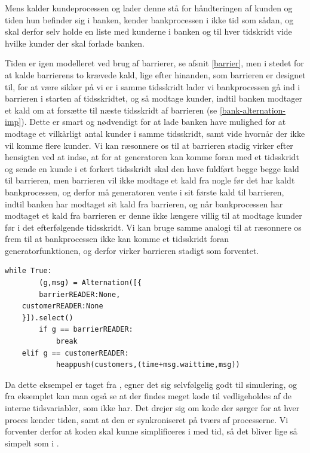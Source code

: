 Mens \simpy kalder kundeprocessen og lader denne stå for håndteringen af kunden 
og tiden hun befinder sig i banken, kender bankprocessen i \pycsp ikke tid som 
sådan, og skal derfor selv holde en liste med kunderne i banken og til hver 
tidskridt vide hvilke kunder der skal forlade banken. 

Tiden er igen modelleret ved brug af barrierer, se afsnit \cref{barrier}, men i 
stedet for at kalde barrierens to krævede kald, lige efter hinanden, som 
barrieren er designet til, for at være sikker på vi er i samme tidsskridt lader 
vi bankprocessen gå ind i barrieren i starten af tidsskridtet, og så modtage 
kunder, indtil banken modtager et kald om at forsætte til næste tidsskridt af 
barrieren (se \cref{bank-alternation-imp}). Dette er smart og nødvendigt for at lade banken have mulighed for 
at modtage et vilkårligt antal kunder i samme tidsskridt, samt vide hvornår der 
ikke vil komme flere kunder.  Vi kan ræsonnere os til at barrieren stadig 
virker efter hensigten ved at indse, at for at generatoren 
kan komme foran med et tidsskridt og sende en kunde i et forkert tidsskridt 
skal den have fuldført begge begge kald til barrieren, men barrieren vil ikke 
modtage et kald fra nogle før det har kaldt bankprocessen, og derfor må 
generatoren vente i sit første kald til barrieren, indtil banken har modtaget 
sit kald fra barrieren, og når bankprocessen har modtaget et kald fra barrieren 
er denne ikke længere villig til at modtage kunder før i det efterfølgende 
tidsskridt. Vi kan bruge samme analogi til at 
ræsonnere os frem til at bankprocessen ikke kan komme et tidsskridt foran 
generatorfunktionen, og derfor virker barrieren stadigt som forventet. 

\begin{lstlisting}[float=hbtp,label=bank-alternation-imp,caption=Modtage en kunde eller 
	barrier i Bankprocessen]
while True:
		(g,msg) = Alternation([{
		barrierREADER:None,
    customerREADER:None
    }]).select()
		if g == barrierREADER:
			break
    elif g == customerREADER:
			heappush(customers,(time+msg.waittime,msg))
\end{lstlisting}

Da dette eksempel er taget fra \simpy, egner det sig selvfølgelig godt til 
simulering, og fra eksemplet kan man også se at der findes meget kode til 
vedligeholdes af de interne tidsvariabler, som \simpy ikke har. Det drejer sig 
om kode der sørger for at hver proces kender tiden, samt at den er 
synkroniseret på tværs af processerne. Vi forventer derfor at koden skal kunne 
simplificeres i \pycsp med tid, så det bliver lige så simpelt som i 
\simpy.

